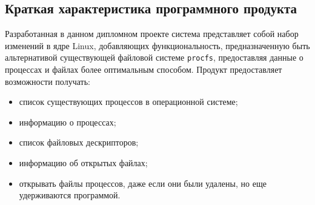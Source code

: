 









\FPround{}


\subsection{Краткая характеристика программного продукта}

Разработанная в данном дипломном проекте система представляет собой набор
изменений в ядре Linux, добавляющих функциональность, предназначенную быть
альтернативой существующей файловой системе \texttt{procfs}, предоставляя данные
о процессах и файлах более оптимальным способом. Продукт предоставляет
возможности получать:
\begin{itemize}
\item список существующих процессов в операционной системе;
\item информацию о процессах;
\item список файловых дескрипторов;
\item информацию об открытых файлах;
\item открывать файлы процессов, даже если они были удалены, но еще удерживаются
  программой.
\end{itemize}

